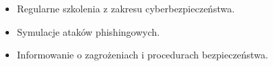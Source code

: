 \begin{itemize}
    \item Regularne szkolenia z zakresu cyberbezpieczeństwa.
    \item Symulacje ataków phishingowych.
    \item Informowanie o zagrożeniach i procedurach bezpieczeństwa.
\end{itemize}